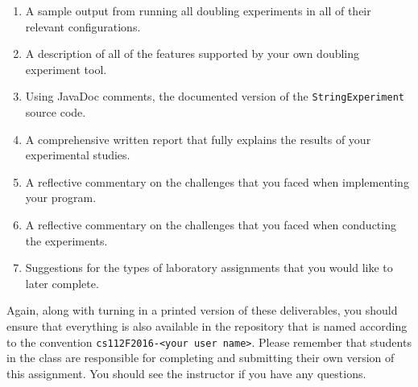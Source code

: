 \begin{enumerate}

  \itemsep0in

  \item A sample output from running all doubling experiments in all of their relevant configurations.

  \item A description of all of the features supported by your own doubling experiment tool.

  \item Using JavaDoc comments, the documented version of the {\tt StringExperiment} source code.

  \item A comprehensive written report that fully explains the results of your experimental studies.

  \item A reflective commentary on the challenges that you faced when implementing your program.

  \item A reflective commentary on the challenges that you faced when conducting the experiments.

  \item Suggestions for the types of laboratory assignments that you would like to later complete.

\end{enumerate}

Again, along with turning in a printed version of these deliverables, you should ensure that everything is also
available in the repository that is named according to the convention {\tt cs112F2016-<your user name>}. Please remember
that students in the class are responsible for completing and submitting their own version of this assignment. You
should see the instructor if you have any questions.



